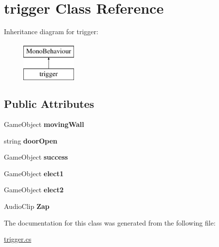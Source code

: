 \hypertarget{classtrigger}{}\section{trigger Class Reference}
\label{classtrigger}
Inheritance diagram for trigger\+:\begin{figure}[H]
\begin{center}
\leavevmode
\includegraphics[height=2.000000cm]{classtrigger}
\end{center}
\end{figure}
\subsection*{Public Attributes}
\begin{DoxyCompactItemize}
\item 
\hypertarget{classtrigger_a63c64e0345e9d2ef9423d8861d94f741}{}Game\+Object {\bfseries moving\+Wall}\label{classtrigger_a63c64e0345e9d2ef9423d8861d94f741}

\item 
\hypertarget{classtrigger_ac114f0bc7c9c656b97fb3dc0c06be5f7}{}string {\bfseries door\+Open}\label{classtrigger_ac114f0bc7c9c656b97fb3dc0c06be5f7}

\item 
\hypertarget{classtrigger_a73e0a60c442d52c1b5a9cdcb8ab34ddb}{}Game\+Object {\bfseries success}\label{classtrigger_a73e0a60c442d52c1b5a9cdcb8ab34ddb}

\item 
\hypertarget{classtrigger_a4d7387fc565a240628c0d63303489129}{}Game\+Object {\bfseries elect1}\label{classtrigger_a4d7387fc565a240628c0d63303489129}

\item 
\hypertarget{classtrigger_af4d9cfb5fed1a0736c0679385bea4c57}{}Game\+Object {\bfseries elect2}\label{classtrigger_af4d9cfb5fed1a0736c0679385bea4c57}

\item 
\hypertarget{classtrigger_abdaf36361a49e8b1eea5053147e5de9d}{}Audio\+Clip {\bfseries Zap}\label{classtrigger_abdaf36361a49e8b1eea5053147e5de9d}

\end{DoxyCompactItemize}


The documentation for this class was generated from the following file\+:\begin{DoxyCompactItemize}
\item 
\hyperlink{trigger_8cs}{trigger.\+cs}\end{DoxyCompactItemize}
